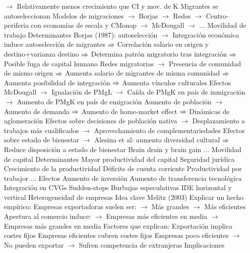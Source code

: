 \documentclass{nuevotema}
\begin{document}
\begin{esquemal}
				\4[] $\to$ Relativamente menos crecimiento que CI y mov. de K
				\4[] Migrantes se autoseleccionan
				\4[] Modelos de migraciones
				\4[] $\to$ Borjas
				\4[] $\to$ Redes
				\4[] $\to$ Centro-periferia con economías de escala y CMonop
				\4[] $\to$ McDougall
				\4[] $\to$ ...
			\3 Movilidad de trabajo
				\4 Determinantes
				\4[] Borjas (1987): autoselección
				\4[] $\to$ Integración económica induce autoselección de migrantes
				\4[] $\Rightarrow$ Correlación salario en origen y destino+varianza destino
				\4[] $\Rightarrow$ Determina patrón migratorio tras integración
				\4[] $\Rightarrow$ Posible fuga de capital humano
				\4[] Redes migratorias
				\4[] $\to$ Presencia de comunidad de mismo origen
				\4[] $\Rightarrow$ Aumenta salario de migrantes de misma comunidad
				\4[] $\Rightarrow$ Aumenta posibilidad de integración
				\4[] $\Rightarrow$ Aumenta vínculos culturales
				\4 Efectos
				\4[] McDougall
				\4[] $\to$ Igualación de PMgL
				\4[] $\to$ Caída de PMgK en país de inmigración
				\4[] $\to$ Aumento de PMgK en país de emigración
				\4[] Aumento de población
				\4[] $\to$ Aumento de demanda
				\4[] $\Rightarrow$ Aumento de home-market effect
				\4[] $\Rightarrow$ Dinámicas de aglomeración
				\4[] Efectos sobre decisiones de población nativa
				\4[] $\to$ Desplazamiento a trabajos más cualificados
				\4[] $\to$ Aprovechamiento de complementariedades
				\4[] Efectos sobre estado de bienestar
				\4[] $\to$ Alesina et al: aumento diversidad cultural
				\4[] $\Rightarrow$ Reduce disposición a estado de bienestar
				\4[] Brain drain y brain gain
				\4[] ...
			\3 Movilidad de capital
				\4 Determinantes
				\4[] Mayor productividad del capital
				\4[] Seguridad jurídica
				\4[] Crecimiento de la productividad
				\4[] Déficits de cuenta corriente
				\4[] Productividad por trabajor
				\4[] ...
				\4 Efectos
				\4[] Aumento de inversión
				\4[] Aumento de transferencia tecnológica
				\4[] Integración en CVGs
				\4[] Sudden-stops
				\4[] Burbujas especulativas
				\4[] IDE horizontal y vertical
		\2 Heterogeneidad de empresas
			\3 Idea clave
				\4 Melitz (2003)
				\4 Explicar un hecho empírico:
				\4[] Empresas exportadoras suelen ser:
				\4[] $\to$ Más grandes
				\4[] $\to$ Más eficientes
				\4[] Apertura al comercio induce:
				\4[] $\to$ Empresas más eficientes en media
				\4[] $\to$ Empresas más grandes en media
				\4 Factores que explican:
				\4[] Exportación implica costes fijos
				\4[] Empresas eficientes cubren costes fijos
				\4[] Empresas poco eficientes
				\4[] $\to$ No pueden exportar
				\4[] $\to$ Sufren competencia de extranjeras
			\3 Implicaciones

\end{esquemal}
\end{document}
